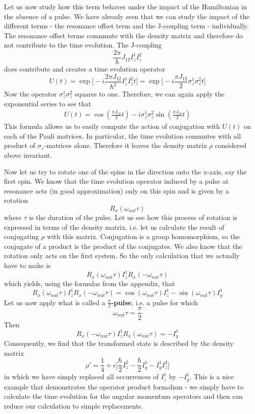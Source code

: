 \documentclass[a4paper, draft]{article}
\theoremstyle{own}
\theoremstyle{remark}
\begin{document}
Let us now study how this term behaves under the impact of the Hamiltonian in the absence of a pulse. We have already seen that we can study the impact of the different terms - the resonance offset term and the J-coupling term - individually.  The resonance offset terms comnmute with the density matrix and therefore do not contribute to the time evolution. The J-coupling 
$$
\frac{2 \pi}{\hbar} J_{12} I_z^1 I_z^2 
$$
does contribute and creates a time evolution operator
$$
U(t) = \exp 
\big[  
- i \frac{2 \pi J_{12}}{\hbar^2}  I_z^1 I_z^2  t
\big]
=
\exp 
\big[  
- i \frac{\pi J_{12}}{2}  \sigma_z^1 \sigma_z^2  t
\big]
$$
Now the operator $\sigma_z^1 \sigma_z^2$ squares to one. Therefore, we can again apply the exponential series to see that
\begin{align}\label{eq:jcouplingtimeevolution}
U(t) = \cos (\frac{\pi J_{12}}{2} t) -i \sigma_z^1 \sigma_z^2 \sin (\frac{\pi J_{12}}{2}  t)
\end{align}
This formula allows us to easily compute the action of conjugation with $U(t)$ on each of the Pauli matrices. In particular, the time evolution commutes with all product of $\sigma_z$-matrices alone. Therefore it leaves the density matrix $\rho$ considered above invariant. 

Now let us try to rotate one of the spins in the direction onto the x-axis, say the first spin. We know that the time evolution operator induced by a pulse at resonance acts (in good approximation) only on this spin and is given by a rotation
$$
R_x(\omega_{nut} \tau)
$$
where $\tau$ is the duration of the pulse. Let us see how this process of rotation is expressed in terms of the density matrix, i.e. let us calculate the result of conjugating $\rho$ with this matrix. Conjugation is a group homomorphism, so the conjugate of a product is the product of the conjugates. We also know that the rotation only acts on the first system. So the only calculation that we actually have to make is
$$
R_x(\omega_{nut} \tau) I_z^1 R_x(-\omega_{nut} \tau)
$$
which yields, using the formulas from the appendix, that
$$
R_x(\omega_{nut} \tau) I_z^1 R_x(-\omega_{nut} \tau) = \cos (\omega_{nut} \tau) I_z^1 - \sin (\omega_{nut} \tau) I_y^1
$$
Let us now apply what is called a {\bf $\frac{\pi}{2}$-pulse}, i.e. a pulse for which 
$$
\omega_{nut} \tau = \frac{\pi}{2}
$$
Then  
$$
R_x(-\omega_{nut} \tau) I_z^1 R_x(\omega_{nut} \tau) = - I_y^1
$$
Consequently, we find that the transformed state is described by the density matrix
$$
\rho' = \frac{1}{4} + \epsilon \big[  \frac{\hbar}{2} I_z^2 - \frac{\hbar}{2} I_y^1 - I_y^1 I_z^2    \big]
$$
in which we have simply replaced all occurrences of $I_z^1$ by $-I_y^1$. This is a nice example that demonstrates the operator product formalism - we simply have to calculate the time evolution for the angular momentum operators and then can reduce our calculation to simple replacements. 
\end{document}
